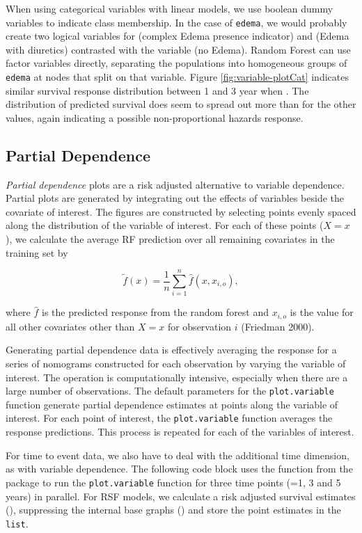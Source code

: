 \documentclass[article]{jss}
\begin{document}
When using categorical variables with linear models, we use boolean
dummy variables to indicate class membership. In the case of
\texttt{edema}, we would probably create two logical variables for
 (complex Edema presence indicator) and
 (Edema with diuretics) contrasted with the
 variable (no Edema). Random Forest can use factor
variables directly, separating the populations into homogeneous groups
of \texttt{edema} at nodes that split on that variable. Figure
\ref{fig:variable-plotCat} indicates similar survival response
distribution between 1 and 3 year when . The
distribution of predicted survival does seem to spread out more than for
the other values, again indicating a possible non-proportional hazards
response.

\subsection{Partial Dependence}\label{partial-dependence}

\emph{Partial dependence} plots are a risk adjusted alternative to
variable dependence. Partial plots are generated by integrating out the
effects of variables beside the covariate of interest. The figures are
constructed by selecting points evenly spaced along the distribution of
the variable of interest. For each of these points (\(X = x\)), we
calculate the average RF prediction over all remaining covariates in the
training set by

\[
\tilde{f}(x) = \frac{1}{n} \sum_{i = 1}^n \hat{f}(x, x_{i, o}),
\label{E:partial}
\]

where \(\hat{f}\) is the predicted response from the random forest and
\(x_{i, o}\) is the value for all other covariates other than \(X = x\)
for observation \(i\) (Friedman 2000).

Generating partial dependence data is effectively averaging the response
for a series of nomograms constructed for each observation by varying
the variable of interest. The operation is computationally intensive,
especially when there are a large number of observations. The default
parameters for the \texttt{plot.variable} function generate partial
dependence estimates at  points along the variable of
interest. For each point of interest, the \texttt{plot.variable}
function averages the  response predictions. This process is
repeated for each of the variables of interest.

For time to event data, we also have to deal with the additional time
dimension, as with variable dependence. The following code block uses
the  function from the  package to run the
\texttt{plot.variable} function for three time points (=1, 3
and 5 years) in parallel. For RSF models, we calculate a risk adjusted
survival estimates (), suppressing the internal
base graphs () and store the point estimates in
the  \texttt{list}.
\end{document}
